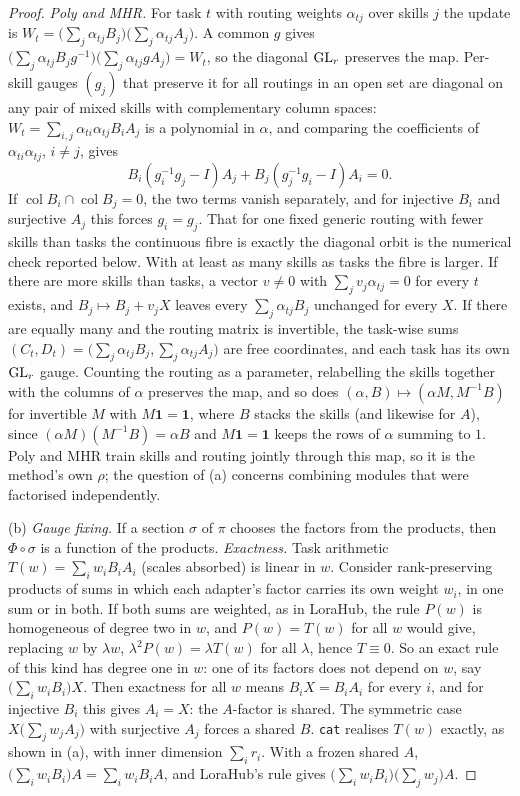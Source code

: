 \begin{proof}
\emph{Poly and MHR.} For task $t$ with routing weights $\alpha_{tj}$ over skills $j$ the update is
$W_t=\big(\sum_j\alpha_{tj}B_j\big)\big(\sum_j\alpha_{tj}A_j\big)$. A common $g$ gives
$\big(\sum_j\alpha_{tj}B_jg^{-1}\big)\big(\sum_j\alpha_{tj}gA_j\big)=W_t$, so the diagonal $\mathrm{GL}_r$ preserves the map. Per-skill
gauges $(g_j)$ that preserve it for all routings in an open set are diagonal on any pair of mixed skills with complementary
column spaces: $W_t=\sum_{i,j}\alpha_{ti}\alpha_{tj}B_iA_j$ is a polynomial in $\alpha$, and comparing the coefficients of
$\alpha_{ti}\alpha_{tj}$, $i\ne j$, gives
\[B_i(g_i^{-1}g_j-I)A_j+B_j(g_j^{-1}g_i-I)A_i=0 .\]
If $\operatorname{col}B_i\cap\operatorname{col}B_j=0$, the two terms vanish separately, and for injective $B_i$ and surjective
$A_j$ this forces $g_i=g_j$. That for one fixed generic routing with fewer skills than tasks the continuous fibre is exactly
the diagonal orbit is the numerical check reported below. With at least as many skills as tasks the fibre is larger. If there
are more skills than tasks, a vector $v\ne0$ with $\sum_jv_j\alpha_{tj}=0$ for every $t$ exists, and $B_j\mapsto B_j+v_jX$
leaves every $\sum_j\alpha_{tj}B_j$ unchanged for every $X$. If there are equally many and the routing matrix is invertible,
the task-wise sums $(C_t,D_t)=\big(\sum_j\alpha_{tj}B_j,\sum_j\alpha_{tj}A_j\big)$ are free coordinates, and each task has its
own $\mathrm{GL}_r$ gauge. Counting the routing as a parameter, relabelling the skills together with the columns of $\alpha$ preserves
the map, and so does $(\alpha,B)\mapsto(\alpha M,M^{-1}B)$ for invertible $M$ with $M\mathbf 1=\mathbf 1$, where $B$ stacks the
skills (and likewise for $A$), since $(\alpha M)(M^{-1}B)=\alpha B$ and $M\mathbf 1=\mathbf 1$ keeps the rows of $\alpha$ summing
to $1$. Poly and MHR train skills and routing jointly through this map, so it is the method's own $\rho$; the question of
(a) concerns combining modules that were factorised independently.

(b) \emph{Gauge fixing.} If a section $\sigma$ of $\pi$ chooses the factors from the products, then $\Phi\circ\sigma$ is a
function of the products. \emph{Exactness.} Task arithmetic $T(w)=\sum_iw_iB_iA_i$ (scales absorbed) is linear in $w$.
Consider rank-preserving products of sums in which each adapter's factor carries its own weight $w_i$, in one sum or in
both. If both sums are weighted, as in LoraHub, the rule $P(w)$ is homogeneous of degree two in $w$, and $P(w)=T(w)$ for all
$w$ would give, replacing $w$ by $\lambda w$, $\lambda^2P(w)=\lambda T(w)$ for all $\lambda$, hence $T\equiv0$. So an exact
rule of this kind has degree one in $w$: one of its factors does not depend on $w$, say $\big(\sum_iw_iB_i\big)X$. Then exactness for all $w$ means $B_iX=B_iA_i$ for every $i$, and for injective $B_i$ this gives
$A_i=X$: the $A$-factor is shared. The symmetric case $X\big(\sum_jw_jA_j\big)$ with surjective $A_j$ forces a shared $B$.
\texttt{cat} realises $T(w)$ exactly, as shown in (a), with inner dimension $\sum_ir_i$. With a frozen shared $A$,
$\big(\sum_iw_iB_i\big)A=\sum_iw_iB_iA$, and LoraHub's rule gives $\big(\sum_iw_iB_i\big)\big(\sum_jw_j\big)A$.


\end{proof}
